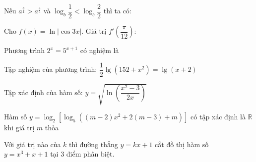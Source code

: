 \documentclass[12pt]{article}
\begin{document}
\begin{vnmultiplechoice}[keycolumns=3]
\begin{question}%
Nếu $a^{\frac{3}{4}}> a^{\frac{4}{5}}$ và $\log_b \dfrac{1}{2}<\log_b \dfrac{2}{2}$ thì ta có:
\vspace{0.2cm}
\datcot
\bonpa
{}
{}
{}
{}
\end{question}

\begin{question}%
Cho $f(x)=\ln\left|\cos 3x\right|$. Giá trị $f'\left(\dfrac{\pi}{12}\right)$:
\vspace{0.2cm}
\datcot
\bonpa
{}
{}
{}
{}
\end{question}

\begin{question}%
Phương trình $2^x=5^{x+1}$ có nghiệm là
\vspace{0.2cm}
\datcot
\bonpa
{}
{}
{}
{}
\end{question}

\begin{question}%
Tập nghiệm của phương trình: $\dfrac{1}{2}\lg\left(152+x^2\right)=\lg\left(x+2\right)$
\vspace{0.2cm}
\datcot
\bonpa
{}
{}
{}
{}
\end{question}

\begin{question}%
Tập xác định của hàm số: $y=\sqrt{\ln\left(\dfrac{x^2-3}{2x}\right)}$
\vspace{0.2cm}
\datcot
\bonpa
{}
{\sai{$\left[-1; 0\right) \cup \left(3; +\infty\right)$.}}
{\dung{$\left[-1; 0\right) \cup \left[3; +\infty\right)$.}}
{\sai{$\left[-1; 0\right] \cup \left[3; +\infty\right)$.}}
\end{question}

\begin{question}%
Hàm số $y=\log_2\left[\log_5\left(\left(m-2\right)x^2+2(m-3)+m\right)\right]$ có tập xác định là $\mathbb{R}$ khi giá trị $m$ thỏa
\vspace{0.2cm}
\datcot
\bonpa
{}
{}
{}
{}
\end{question}

\begin{question}%
Với giá trị nào của $k$ thì đường thẳng $y=kx+1$ cắt đồ thị hàm số $y=x^3+x+1$ tại 3 điểm phân biệt.
\vspace{0.2cm}
\datcot
\bonpa
{}
{}
{}
{}
\end{question}


\end{vnmultiplechoice}
\end{document}
